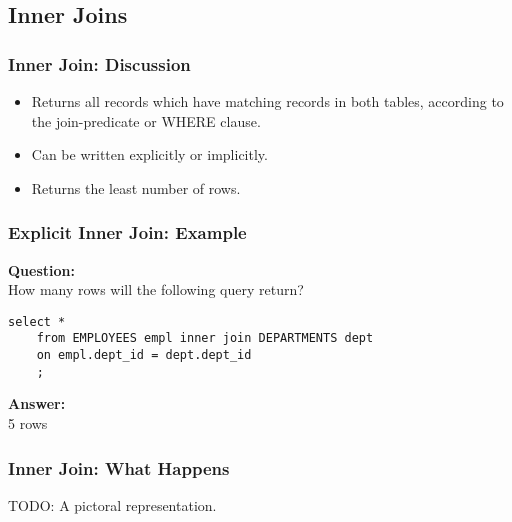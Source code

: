 \documentclass{beamer}
\begin{document}
\subsection{Inner Joins} %

\begin{frame}[containsverbatim] %
  \frametitle{Inner Join: Discussion}
  \begin{itemize}
  \item Returns all records which have matching records in both
    tables, according to the join-predicate or WHERE clause.
  \item Can be written explicitly or implicitly.
  \item Returns the least number of rows.
  \end{itemize}
\end{frame}

\begin{frame}[fragile] %
  \frametitle{Explicit Inner Join: Example}

  \textbf{Question:}\\ How many rows will the following query return?
  \bigskip

  \begin{lstlisting}[title={\tiny Source: https://github.com/Choens/sql-survival-guide/blob/master/sql/04-joins/cross-joins.sql}]
    select *
    from EMPLOYEES empl inner join DEPARTMENTS dept
    on empl.dept_id = dept.dept_id
    ;
  \end{lstlisting}

  \bigskip
  \pause
  \textbf{Answer:}\\ 5 rows

\end{frame}

\begin{frame}
  \frametitle{Inner Join: What Happens}
  TODO: A pictoral representation.
\end{frame}
\end{document}
